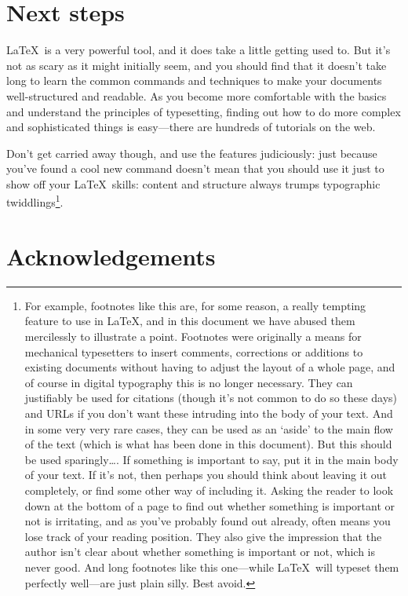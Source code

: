 \begin{refsection}
\section{Next steps}

\LaTeX\ is a very powerful tool, and it does take a little getting used to. But it's not as scary as it might initially seem, and you should find that it doesn't take long to learn the common commands and techniques to make your documents well-structured and readable. As you become more comfortable with the basics and understand the principles of typesetting, finding out how to do more complex and sophisticated things is easy---there are hundreds of tutorials on the web. 

Don't get carried away though, and use the features judiciously: just because you've found a cool new command doesn't mean that you should use it just to show off your \LaTeX\ skills: content and structure always trumps typographic twiddlings\footnote{For example, footnotes like this are, for some reason, a really tempting feature to use in \LaTeX, and in this document we have abused them mercilessly to illustrate a point. Footnotes were originally a means for mechanical typesetters to insert comments, corrections or additions to existing documents without having to adjust the layout of a whole page, and of course in digital typography this is no longer necessary. They can justifiably be used for citations (though it's not common to do so these days) and URLs if you don't want these intruding into the body of your text. And in some very very rare cases, they can be used as an `aside' to the main flow of the text (which is what has been done in this document). But this should be used sparingly\ldots. If something is important to say, put it in the main body of your text. If it's not, then perhaps you should think about leaving it out completely, or find some other way of including it. Asking the reader to look down at the bottom of a page to find out whether something is important or not is irritating, and as you've probably found out already, often means you lose track of your reading position. They also give the impression that the author isn't clear about whether something is important or not, which is never good. And long footnotes like this one---while \LaTeX\ will typeset them perfectly well---are just plain silly. Best avoid.}.

\section{Acknowledgements}


\end{refsection}
